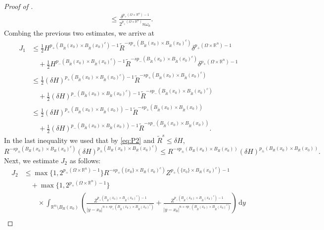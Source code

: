 \documentclass[10pt,a4paper]{amsart}
\newcommand{\R}{\mathbb{R}}
\begin{document}
\begin{proof} [Proof of ]
\begin{align*}
& \leq \frac{\delta^{p_{+}(\Omega\times\R^n)-1}}{2^{p_{+}(\Omega\times\R^n)}n\omega_n}.
\end{align*}
Combing the previous two estimates, we arrive at 
\begin{align*}
J_1 & \leq  \frac12 H^{p_+(B_{\widetilde{R}}(x_0) \times B_{\widetilde{R}}(x_0)^c)-1} \widetilde{R}^{-sp_+(B_{\widetilde{R}}(x_0) \times B_{\widetilde{R}}(x_0)^c)} \delta^{p_{+}(\Omega\times\R^n)-1} \\
& \quad +\frac12 H^{p_-(B_{\widetilde{R}}(x_0) \times B_{\widetilde{R}}(x_0)^c)-1} \widetilde{R}^{-sp_-(B_{\widetilde{R}}(x_0) \times B_{\widetilde{R}}(x_0)^c)}\delta^{p_{+}(\Omega\times\R^n)-1} \\
& \leq \frac12 (\delta H)^{p_+(B_{\widetilde{R}}(x_0) \times B_{\widetilde{R}}(x_0)^c)-1} \widetilde{R}^{-sp_+(B_{\widetilde{R}}(x_0) \times B_{\widetilde{R}}(x_0)^c)}  \\
& \quad +\frac12 (\delta H)^{p_-(B_{\widetilde{R}}(x_0) \times B_{\widetilde{R}}(x_0)^c)-1} \widetilde{R}^{-sp_-(B_{\widetilde{R}}(x_0) \times B_{\widetilde{R}}(x_0)^c)} \\
& \leq \frac12 (\delta H)^{p_+(B_{\widetilde{R}}(x_0) \times B_{\widetilde{R}}(x_0))-1} \widetilde{R}^{-sp_+(B_{\widetilde{R}}(x_0) \times B_{\widetilde{R}}(x_0))}  \\
& \quad +\frac12 (\delta H)^{p_-(B_{\widetilde{R}}(x_0) \times B_{\widetilde{R}}(x_0))-1} \widetilde{R}^{-sp_-(B_{\widetilde{R}}(x_0) \times B_{\widetilde{R}}(x_0))}.
\end{align*}
In the last inequality we used that by \eqref{eq:P2} and $\widetilde{R}^s\leq \delta H$,
\[  R^{-s p_{\pm}(B_R(x_0)\times B_R(x_0)^c)} (\delta H)^{p_{\pm}(B_R(x_0)\times B_R(x_0)^c)}   \leq R^{-s p_{\pm}(B_R(x_0)\times B_R(x_0))} (\delta H)^{p_{\pm}(B_R(x_0)\times B_R(x_0))}. \]
Next, we estimate $J_2$ as follows:
\begin{equation}\label{eq:estJ2}
\begin{aligned}
J_2 &\leq \max\{1,2^{p_+(\Omega\times\R^n)-1}\} R^{-sp_{+}(\{x_0\}\times B_R(x_0)^c)}Z^{p_{+}(\{x_0\}\times B_R(x_0)^c)-1} \\
&\quad + \max\{1,2^{p_+(\Omega\times\R^n)-1}\}  \\
&\qquad \times \int_{\mathbb{R}^n \setminus B_{R}(x_0)} \left(\frac{Z^{p_{+}(B_{\widetilde{R}}(x_0)\times B_{\widetilde{R}}(x_0)^c)-1}}{|y-x_0|^{n+sp_{+}(B_{\widetilde{R}}(x_0)\times B_{\widetilde{R}}(x_0)^c)}}  + \frac{Z^{p_{-}(B_{\widetilde{R}}(x_0)\times B_{\widetilde{R}}(x_0)^c)-1}}{|y-x_0|^{n+sp_{-}(B_{\widetilde{R}}(x_0)\times B_{\widetilde{R}}(x_0)^c)}} \right)\,\mathrm{d}y \\

\end{aligned}
\end{equation}
\end{proof}
\end{document}
